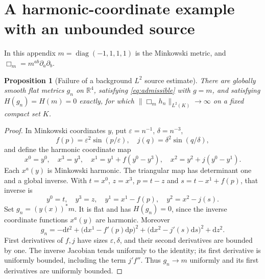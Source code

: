 \documentclass[11pt,a4paper]{article}
\numberwithin{equation}{section}
\newcommand{\dd}{\mathrm d}
\newcommand{\R}{\mathbb R}
\newtheorem{proposition}[theorem]{Proposition}
\theoremstyle{definition}
\begin{document}
\appendix
\section{A harmonic-coordinate example with an unbounded source}\label{sec:shear}

In this appendix $m=\operatorname{diag}(-1,1,1,1)$ is the Minkowski
metric, and $\Box_m=m^{ab}\partial_a\partial_b$.

\begin{proposition}[Failure of a background $L^2$ source estimate]\label{prop:shear}
There are globally smooth flat metrics $g_n$ on $\R^4$, satisfying \eqref{eq:admissible} with $g=m$, and satisfying $H(g_n)=H(m)=0$ exactly, for which $\|\Box_mh_n\|_{L^2(K)}\to\infty$ on a fixed compact set $K$.
\end{proposition}
\begin{proof}
In Minkowski coordinates $y$, put $\varepsilon=n^{-1}$, $\delta=n^{-3}$,
\begin{equation*}
f(p)=\varepsilon^2\sin(p/\varepsilon),\quad j(q)=\delta^2\sin(q/\delta),
\end{equation*}
and define the harmonic coordinate map
\begin{equation*}
x^0=y^0,\quad x^3=y^3,\quad
x^1=y^1+f(y^0-y^3),\quad x^2=y^2+j(y^0-y^1).
\end{equation*}
Each $x^a(y)$ is Minkowski harmonic. The triangular map has determinant one and a global inverse. With $t=x^0$, $z=x^3$, $p=t-z$ and $s=t-x^1+f(p)$, that inverse is
\begin{equation*}
y^0=t,\quad y^3=z,\quad y^1=x^1-f(p),\quad y^2=x^2-j(s).
\end{equation*}
Set $g_n=(y(x))^*m$. It is flat and has $H(g_n)=0$, since the inverse coordinate functions $x^a(y)$ are harmonic. Moreover
\begin{equation*}
g_n=-\dd t^2+\bigl(\dd x^1-f'(p)\dd p\bigr)^2
+\bigl(\dd x^2-j'(s)\dd s\bigr)^2+\dd z^2.
\end{equation*}
First derivatives of $f,j$ have sizes $\varepsilon,\delta$, and their second derivatives are bounded by one. The inverse Jacobian tends uniformly to the identity; its first derivative is uniformly bounded, including the term $j' f''$. Thus $g_n\to m$ uniformly and its first derivatives are uniformly bounded.


\end{proof}
\end{document}
